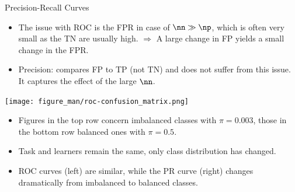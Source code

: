 \documentclass[11pt,compress,t,notes=noshow, xcolor=table]{beamer}
\begin{document}
\begin{vbframe}{Precision-Recall Curves}


\framebreak

\begin{itemize}
  \item The issue with ROC is the FPR in case of $\nn \gg \np$, which is often 
  very small as the TN are usually high. \newline
  $\Rightarrow$ A large change in FP yields a small change in the FPR.
  \item Precision: compares FP to TP (not TN) and does not suffer from this 
  issue. It captures the effect of the large $\nn$.
\end{itemize}

\begin{center}
  \texttt{[image: figure\_man/roc-confusion\_matrix.png]}
\end{center}

\framebreak

\begin{footnotesize}

\vspace{-0.2cm}
\begin{itemize}
  \item Figures in the top row concern imbalanced classes with $\pi = 0.003$, 
  those in the bottom row balanced ones with $\pi = 0.5$.
  \item Task and learners remain the same, only class distribution has changed.
  \item ROC curves (left) are similar, while the PR curve (right) changes 
  dramatically from imbalanced to balanced classes. 
\end{itemize}


\end{footnotesize}
\end{vbframe}
\end{document}
